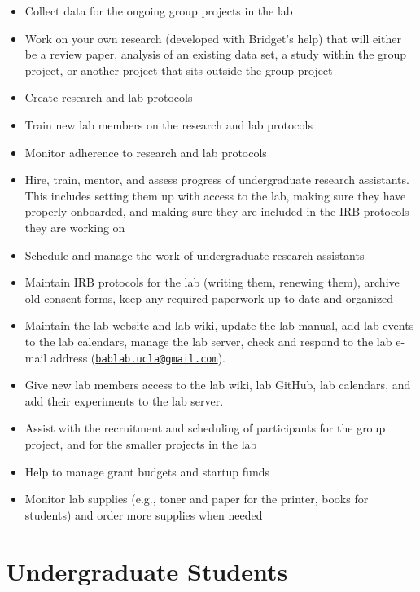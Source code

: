 \documentclass[]{book}
\providecommand{\tightlist}{%
  \setlength{\itemsep}{0pt}\setlength{\parskip}{0pt}}
\begin{document}
\begin{itemize}
\tightlist
\item
  Collect data for the ongoing group projects in the lab
\item
  Work on your own research (developed with Bridget's help) that will either be a review paper, analysis of an existing data set, a study within the group project, or another project that sits outside the group project
\item
  Create research and lab protocols
\item
  Train new lab members on the research and lab protocols
\item
  Monitor adherence to research and lab protocols
\item
  Hire, train, mentor, and assess progress of undergraduate research assistants. This includes setting them up with access to the lab, making sure they have properly onboarded, and making sure they are included in the IRB protocols they are working on
\item
  Schedule and manage the work of undergraduate research assistants
\item
  Maintain IRB protocols for the lab (writing them, renewing them), archive old consent forms, keep any required paperwork up to date and organized
\item
  Maintain the lab website and lab wiki, update the lab manual, add lab events to the lab calendars, manage the lab server, check and respond to the lab e-mail address (\href{mailto:bablab.ucla@gmail.com}{\nolinkurl{bablab.ucla@gmail.com}}).
\item
  Give new lab members access to the lab wiki, lab GitHub, lab calendars, and add their experiments to the lab server.
\item
  Assist with the recruitment and scheduling of participants for the group project, and for the smaller projects in the lab
\item
  Help to manage grant budgets and startup funds
\item
  Monitor lab supplies (e.g., toner and paper for the printer, books for students) and order more supplies when needed
\end{itemize}

\hypertarget{undergraduate-students}{%
\section{Undergraduate Students}\label{undergraduate-students}}
\end{document}
